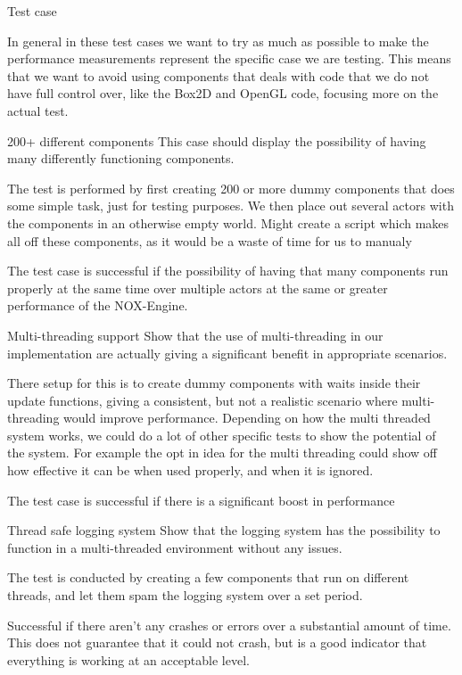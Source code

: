 Test case

In general in these test cases we want to try as much as possible to make the performance measurements represent the specific case we are testing.
This means that we want to avoid using components that deals with code that we do not have full control over, like the Box2D and OpenGL code, focusing more on the actual test.





200+ different components
This case should display the possibility of having many differently functioning components. 

The test is performed by first creating 200 or more dummy components that does some simple task, just for testing purposes. 
We then place out several actors with the components in an otherwise empty world.
Might create a script which makes all off these components, as it would be a waste of time for us to manualy 

The test case is successful if the possibility of having that many components run properly at the same time over multiple actors at the same or greater performance of the NOX-Engine.





Multi-threading support
Show that the use of multi-threading in our implementation are actually giving a significant benefit in appropriate scenarios.

There setup for this is to create dummy components with waits inside their update functions, giving a consistent, but not a realistic scenario where multi-threading would improve performance.
Depending on how the multi threaded system works, we could do a lot of other specific tests to show the potential of the system.
For example the opt in idea for the multi threading could show off how effective it can be when used properly, and when it is ignored.

The test case is successful if there is a significant boost in performance 





Thread safe logging system
Show that the logging system has the possibility to function in a multi-threaded environment without any issues.

The test is conducted by creating a few components that run on different threads, and let them spam the logging system over a set period.

Successful if there aren't any crashes or errors over a substantial amount of time. 
This does not guarantee that it could not crash, but is a good indicator that everything is working at an acceptable level.





